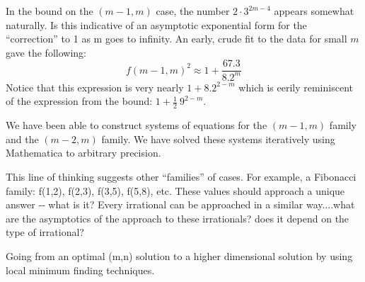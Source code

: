 \documentclass[superscriptaddress,reprint,amsmath,amssymb,aps]{revtex4-1}
\newcommand{\half}{\frac{1}{2}}
\begin{document}
In the bound on the $(m-1,m)$ case, the number $2 \cdot 3^{2m-4}$ appears
somewhat naturally.  Is this indicative of an asymptotic exponential form
for the ``correction'' to 1 as m goes to infinity.  An early, crude fit to
the data for small $m$ gave the following:
\begin{equation*}
f(m-1,m)^2 \approx 1 + \frac{67.3}{8.2^m}
\end{equation*}
Notice that this expression is very nearly $1 + 8.2^{2-m}$ which
is eerily reminiscent of the expression from the bound: $1 + \half~9^{2-m}$.

\vspace{0.15in}
We have been able to construct systems of equations for the $(m-1,m)$ family
and the $(m-2,m)$ family.  We have solved these systems iteratively using
Mathematica to arbitrary precision.

\vspace{0.15in}
This line of thinking suggests other ``families'' of cases.  For example, a
Fibonacci family:  f(1,2), f(2,3), f(3,5), f(5,8), etc.  These values should
approach a unique answer ‐‐ what is it?  Every irrational can be approached
in a similar way....what are the asymptotics of the approach to these
irrationals?  does it depend on the type of irrational?

\vspace{.15in}

Going from an optimal (m,n) solution to a higher dimensional solution by
using local minimum finding techniques.
\end{document}
